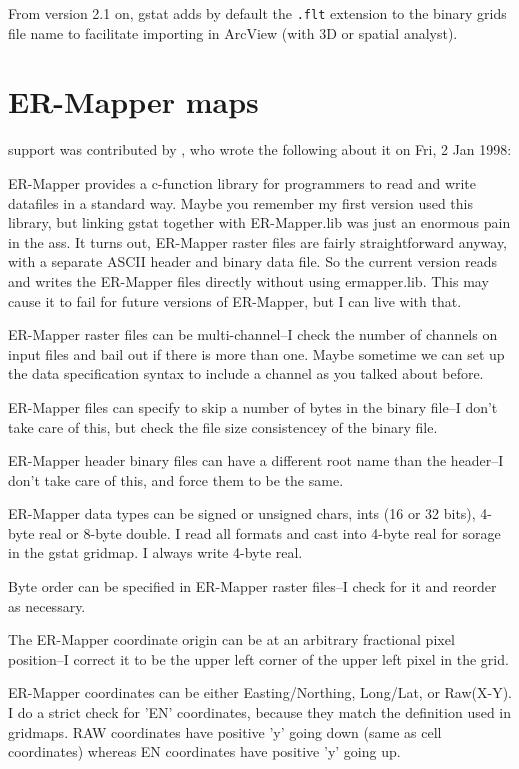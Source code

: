 \documentclass[a4paper,12pt]{book}
\newcommand{\code}[1]{\texttt{#1}}
\begin{document}
From version 2.1 on, gstat adds by default the \code{.flt} extension to
the binary grids file name to facilitate importing in ArcView (with 3D
or spatial analyst).

\section{ER-Mapper maps}

support was contributed by , who wrote the following about
it on Fri, 2 Jan 1998:

ER-Mapper provides a c-function library for programmers to read and
write datafiles in a standard way. Maybe you remember my first version
used this library, but linking gstat together with ER-Mapper.lib was
just an enormous pain in the ass. It turns out, ER-Mapper raster files
are fairly straightforward anyway, with a separate ASCII header and
binary data file. So the current version reads and writes the ER-Mapper
files directly without using ermapper.lib. This may cause it to fail
for future versions of ER-Mapper, but I can live with that.

ER-Mapper raster files can be multi-channel--I check the number
of channels on input files and bail out if there is more than one.
Maybe sometime we can set up the data specification syntax to include
a channel as you talked about before.

ER-Mapper files can specify to skip a number of bytes in the binary
file--I don't take care of this, but check the file size consistencey
of the binary file.

ER-Mapper header binary files can have a different root name than the
header--I don't take care of this, and force them to be the same.

ER-Mapper data types can be signed or unsigned chars, ints (16 or 32
bits), 4-byte real or 8-byte double. I read all formats and cast into
4-byte real for sorage in the gstat gridmap. I always write 4-byte real.

Byte order can be specified in ER-Mapper raster files--I check for it
and reorder as necessary.

The ER-Mapper coordinate origin can be at an arbitrary fractional pixel
position--I correct it to be the upper left corner of the upper left
pixel in the grid.

ER-Mapper coordinates can be either Easting/Northing, Long/Lat, or
Raw(X-Y). I do a strict check for 'EN' coordinates, because they match
the definition used in gridmaps. RAW coordinates have positive 'y' going
down (same as cell coordinates) whereas EN coordinates have positive
'y' going up.
\end{document}
